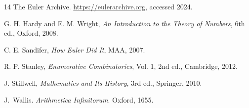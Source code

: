 \documentclass[11pt,a4paper,twoside]{book}
\theoremstyle{eulerstyle}
\theoremstyle{definition}
\begin{document}
\begin{thebibliography}{14}
The Euler Archive.
\newblock \url{https://eulerarchive.org}, accessed 2024.

G. H. Hardy and E. M. Wright, \textit{An Introduction to the Theory of Numbers}, 6th ed., Oxford, 2008.

C. E. Sandifer, \textit{How Euler Did It}, MAA, 2007.

R. P. Stanley, \textit{Enumerative Combinatorics}, Vol. 1, 2nd ed., Cambridge, 2012.

J. Stillwell, \textit{Mathematics and Its History}, 3rd ed., Springer, 2010.

J.~Wallis.
\newblock \emph{Arithmetica Infinitorum}.
\newblock Oxford, 1655.

\end{thebibliography}
\end{document}
